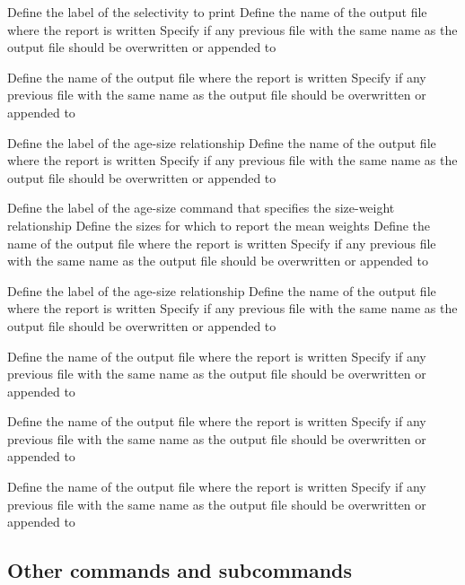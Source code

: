 \par\textbf{}\par
{} {Define the label of the selectivity to print}
 {Define the name of the output file where the report is written}
 {Specify if any previous file with the same name as the output file should be overwritten or appended to}
\par\textbf{}\par
{} {Define the name of the output file where the report is written}
 {Specify if any previous file with the same name as the output file should be overwritten or appended to}
\par\textbf{}\par
{} {Define the label of the age-size relationship}
 {Define the name of the output file where the report is written}
 {Specify if any previous file with the same name as the output file should be overwritten or appended to}
\par\textbf{}\par
{} {Define the label of the age-size command that specifies the size-weight relationship}
 {Define the sizes for which to report the mean weights}
 {Define the name of the output file where the report is written}
 {Specify if any previous file with the same name as the output file should be overwritten or appended to}
\par\textbf{}\par
{} {Define the label of the age-size relationship}
 {Define the name of the output file where the report is written}
 {Specify if any previous file with the same name as the output file should be overwritten or appended to}
\par\textbf{}\par
{} {Define the name of the output file where the report is written}
 {Specify if any previous file with the same name as the output file should be overwritten or appended to}
\par\textbf{}\par
{} {Define the name of the output file where the report is written}
 {Specify if any previous file with the same name as the output file should be overwritten or appended to}
\par\textbf{}\par
{} {Define the name of the output file where the report is written}
 {Specify if any previous file with the same name as the output file should be overwritten or appended to}
\subsection{Other commands and subcommands}\par
{}\par\par
